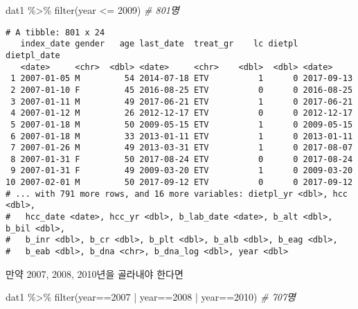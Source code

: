 \documentclass[
]{article}
\newenvironment{Shaded}{\begin{snugshade}}{\end{snugshade}}
\newcommand{\CommentTok}[1]{\textcolor[rgb]{0.56,0.35,0.01}{\textit{#1}}}
\newcommand{\DecValTok}[1]{\textcolor[rgb]{0.00,0.00,0.81}{#1}}
\newcommand{\FunctionTok}[1]{\textcolor[rgb]{0.00,0.00,0.00}{#1}}
\newcommand{\NormalTok}[1]{#1}
\newcommand{\SpecialCharTok}[1]{\textcolor[rgb]{0.00,0.00,0.00}{#1}}
\begin{document}
\begin{Shaded}
\begin{Highlighting}[]
\NormalTok{dat1 }\SpecialCharTok{\%\textgreater{}\%} 
   \FunctionTok{filter}\NormalTok{(year }\SpecialCharTok{\textless{}=} \DecValTok{2009}\NormalTok{) }\CommentTok{\# 801명}
\end{Highlighting}
\end{Shaded}

\begin{verbatim}
# A tibble: 801 x 24
   index_date gender   age last_date  treat_gr    lc dietpl dietpl_date
   <date>     <chr>  <dbl> <date>     <chr>    <dbl>  <dbl> <date>     
 1 2007-01-05 M         54 2014-07-18 ETV          1      0 2017-09-13 
 2 2007-01-10 F         45 2016-08-25 ETV          0      0 2016-08-25 
 3 2007-01-11 M         49 2017-06-21 ETV          1      0 2017-06-21 
 4 2007-01-12 M         26 2012-12-17 ETV          0      0 2012-12-17 
 5 2007-01-18 M         50 2009-05-15 ETV          1      0 2009-05-15 
 6 2007-01-18 M         33 2013-01-11 ETV          1      0 2013-01-11 
 7 2007-01-26 M         49 2013-03-31 ETV          1      0 2017-08-07 
 8 2007-01-31 F         50 2017-08-24 ETV          0      0 2017-08-24 
 9 2007-01-31 F         49 2009-03-20 ETV          1      0 2009-03-20 
10 2007-02-01 M         50 2017-09-12 ETV          0      0 2017-09-12 
# ... with 791 more rows, and 16 more variables: dietpl_yr <dbl>, hcc <dbl>,
#   hcc_date <date>, hcc_yr <dbl>, b_lab_date <date>, b_alt <dbl>, b_bil <dbl>,
#   b_inr <dbl>, b_cr <dbl>, b_plt <dbl>, b_alb <dbl>, b_eag <dbl>,
#   b_eab <dbl>, b_dna <chr>, b_dna_log <dbl>, year <dbl>
\end{verbatim}

만약 2007, 2008, 2010년을 골라내야 한다면

\begin{Shaded}
\begin{Highlighting}[]
\NormalTok{dat1 }\SpecialCharTok{\%\textgreater{}\%} 
   \FunctionTok{filter}\NormalTok{(year}\SpecialCharTok{==}\DecValTok{2007} \SpecialCharTok{|}\NormalTok{ year}\SpecialCharTok{==}\DecValTok{2008} \SpecialCharTok{|}\NormalTok{ year}\SpecialCharTok{==}\DecValTok{2010}\NormalTok{) }\CommentTok{\# 707명}
\end{Highlighting}
\end{Shaded}
\end{document}
